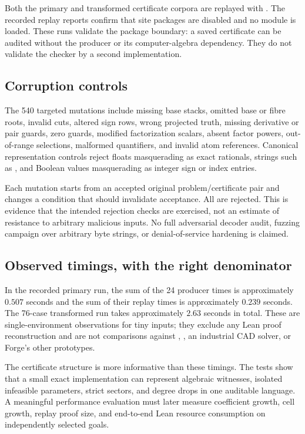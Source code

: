 Both the primary and transformed certificate corpora are replayed with . The recorded replay reports confirm that site packages are disabled and no  module is loaded. These runs validate the package boundary: a saved certificate can be audited without the producer or its computer-algebra dependency. They do not validate the checker by a second implementation.

\subsection{Corruption controls}
The 540 targeted mutations include missing base stacks, omitted base or fibre roots, invalid cuts, altered sign rows, wrong projected truth, missing derivative or pair guards, zero guards, modified factorization scalars, absent factor powers, out-of-range selections, malformed quantifiers, and invalid atom references. Canonical representation controls reject floats masquerading as exact rationals, strings such as , and Boolean values masquerading as integer sign or index entries.

Each mutation starts from an accepted original problem/certificate pair and changes a condition that should invalidate acceptance. All are rejected. This is evidence that the intended rejection checks are exercised, not an estimate of resistance to arbitrary malicious inputs. No full adversarial decoder audit, fuzzing campaign over arbitrary byte strings, or denial-of-service hardening is claimed.

\subsection{Observed timings, with the right denominator}
In the recorded primary run, the sum of the 24 producer times is approximately $0.507$ seconds and the sum of their replay times is approximately $0.239$ seconds. The 76-case transformed run takes approximately $2.63$ seconds in total. These are single-environment observations for tiny inputs; they exclude any Lean proof reconstruction and are not comparisons against , , an industrial CAD solver, or Forge's other prototypes.

The certificate structure is more informative than these timings. The tests show that a small exact implementation can represent algebraic witnesses, isolated infeasible parameters, strict sectors, and degree drops in one auditable language. A meaningful performance evaluation must later measure coefficient growth, cell growth, replay proof size, and end-to-end Lean resource consumption on independently selected goals.

